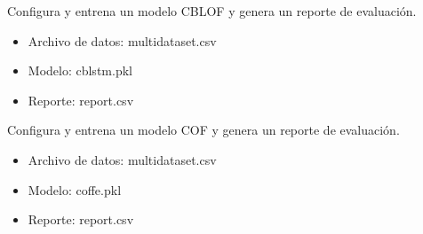 \documentclass[letterpaper,10pt,english]{sphinxmanual}
\begin{document}

\begin{fulllineitems}
\label{\detokenize{tutorial:tutorial.cblofTutorial}}
\pysigstartsignatures
{}
\pysigstopsignatures
\sphinxAtStartPar
Configura y entrena un modelo CBLOF y genera un reporte de evaluación.
\begin{itemize}
\item {} 
\sphinxAtStartPar
Archivo de datos: multi\sphinxhyphen{}dataset.csv

\item {} 
\sphinxAtStartPar
Modelo: cblstm.pkl

\item {} 
\sphinxAtStartPar
Reporte: report.csv

\end{itemize}

\end{fulllineitems}


\begin{fulllineitems}
\label{\detokenize{tutorial:tutorial.cofTutorial}}
\pysigstartsignatures
{}
\pysigstopsignatures
\sphinxAtStartPar
Configura y entrena un modelo COF y genera un reporte de evaluación.
\begin{itemize}
\item {} 
\sphinxAtStartPar
Archivo de datos: multi\sphinxhyphen{}dataset.csv

\item {} 
\sphinxAtStartPar
Modelo: coffe.pkl

\item {} 
\sphinxAtStartPar
Reporte: report.csv

\end{itemize}

\end{fulllineitems}

\end{document}
